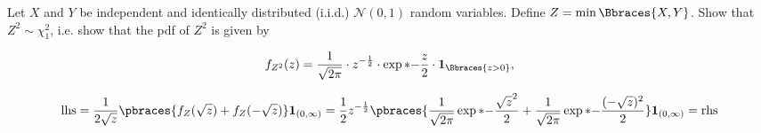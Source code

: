 
\begin{exercise}

Let $X$ and $Y$ be independent and identically distributed (i.i.d.) $\mathcal N(0, 1)$ random variables.
Define $Z = \min \Bbraces{X, Y}$.
Show that $Z^2 \sim \chi_1^2$, i.e. show that the pdf of $Z^2$ is given by

\begin{align*}
    f_{Z^2}(z)
    =
    \frac{1}{\sqrt{2 \pi}} \cdot z^{-\frac{1}{2}} \cdot \exp*{-\frac{z}{2}} \cdot \mathbf 1_\Bbraces{z > 0},
\end{align*}

\end{exercise}


\begin{solution}

\begin{align*}
    \text{lhs}
    =
    \frac{1}{2 \sqrt z}
    \pbraces
    {
        f_Z(\sqrt z) + f_Z(-\sqrt z)
    }
    \mathbf 1_{(0, \infty)}
    =
    \frac{1}{2} z^{-\frac{1}{2}}
    \pbraces
    {
        \frac{1}{\sqrt{2 \pi}} \exp*{-\frac{\sqrt z^2}{2}}
        +
        \frac{1}{\sqrt{2 \pi}} \exp*{-\frac{(-\sqrt z)^2}{2}}
    }
    \mathbf 1_{(0, \infty)}
    =
    \text{rhs}
\end{align*}

\end{solution}

